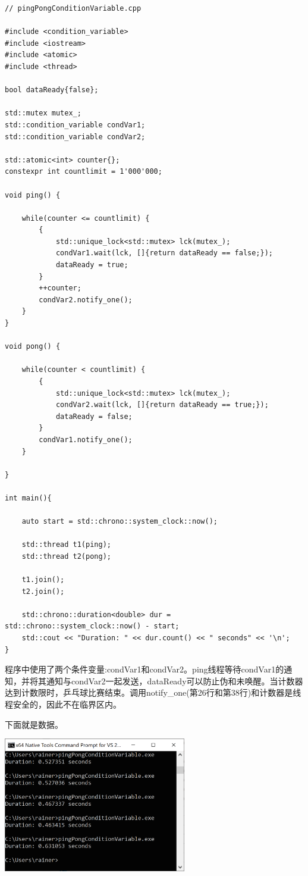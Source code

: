 \begin{lstlisting}[style=styleCXX]
// pingPongConditionVariable.cpp

#include <condition_variable>
#include <iostream>
#include <atomic>
#include <thread>

bool dataReady{false};

std::mutex mutex_;
std::condition_variable condVar1;
std::condition_variable condVar2;

std::atomic<int> counter{};
constexpr int countlimit = 1'000'000;

void ping() {

	while(counter <= countlimit) {
		{
			std::unique_lock<std::mutex> lck(mutex_);
			condVar1.wait(lck, []{return dataReady == false;});
			dataReady = true;
		}
		++counter;
		condVar2.notify_one();
	}
}

void pong() {

	while(counter < countlimit) {
		{
			std::unique_lock<std::mutex> lck(mutex_);
			condVar2.wait(lck, []{return dataReady == true;});
			dataReady = false;
		}
		condVar1.notify_one();
	}

}

int main(){

	auto start = std::chrono::system_clock::now();
	
	std::thread t1(ping);
	std::thread t2(pong);
	
	t1.join();
	t2.join();
	
	std::chrono::duration<double> dur = std::chrono::system_clock::now() - start;
	std::cout << "Duration: " << dur.count() << " seconds" << '\n';
}
\end{lstlisting}

程序中使用了两个条件变量:condVar1和condVar2。ping线程等待condVar1的通知，并将其通知与condVar2一起发送，dataReady可以防止伪和未唤醒。当计数器达到计数限时，乒乓球比赛结束。调用notify\_one(第26行和第38行)和计数器是线程安全的，因此不在临界区内。

下面就是数据。

\begin{center}
\includegraphics[width=0.6\textwidth]{content/3/chapter7/images/2.png}\\
\end{center}

